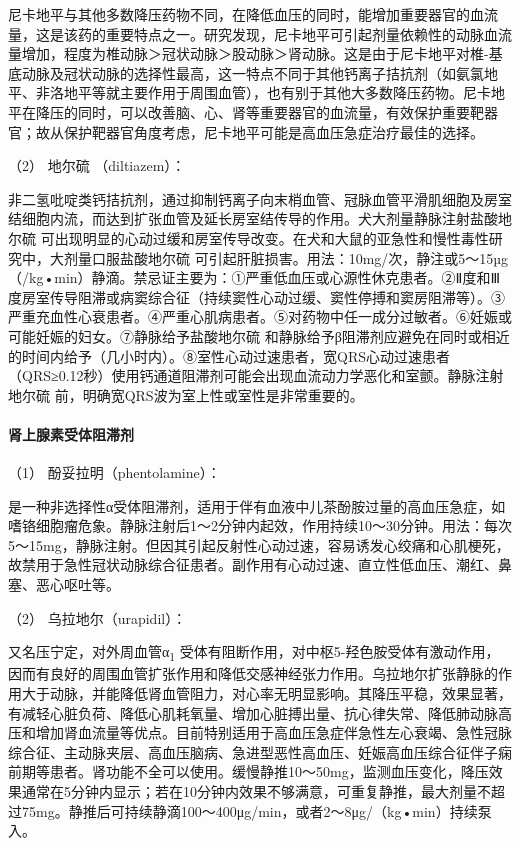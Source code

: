 尼卡地平与其他多数降压药物不同，在降低血压的同时，能增加重要器官的血流量，这是该药的重要特点之一。研究发现，尼卡地平可引起剂量依赖性的动脉血流量增加，程度为椎动脉＞冠状动脉＞股动脉＞肾动脉。这是由于尼卡地平对椎-基底动脉及冠状动脉的选择性最高，这一特点不同于其他钙离子拮抗剂（如氨氯地平、非洛地平等就主要作用于周围血管），也有别于其他大多数降压药物。尼卡地平在降压的同时，可以改善脑、心、肾等重要器官的血流量，有效保护重要靶器官；故从保护靶器官角度考虑，尼卡地平可能是高血压急症治疗最佳的选择。

\hypertarget{text00108.htmlux5cux23CHP4-7-3-2-2-2-2}{}
（2） 地尔硫{} （diltiazem）：

非二氢吡啶类钙拮抗剂，通过抑制钙离子向末梢血管、冠脉血管平滑肌细胞及房室结细胞内流，而达到扩张血管及延长房室结传导的作用。犬大剂量静脉注射盐酸地尔硫{}
可出现明显的心动过缓和房室传导改变。在犬和大鼠的亚急性和慢性毒性研究中，大剂量口服盐酸地尔硫{}
可引起肝脏损害。用法：10mg/次，静注或5～15µg（/kg•min）静滴。禁忌证主要为：①严重低血压或心源性休克患者。②Ⅱ度和Ⅲ度房室传导阻滞或病窦综合征（持续窦性心动过缓、窦性停搏和窦房阻滞等）。③严重充血性心衰患者。④严重心肌病患者。⑤对药物中任一成分过敏者。⑥妊娠或可能妊娠的妇女。⑦静脉给予盐酸地尔硫{}
和静脉给予β阻滞剂应避免在同时或相近的时间内给予（几小时内）。⑧室性心动过速患者，宽QRS心动过速患者（QRS≥0.12秒）使用钙通道阻滞剂可能会出现血流动力学恶化和室颤。静脉注射地尔硫{}
前，明确宽QRS波为室上性或室性是非常重要的。

\paragraph{肾上腺素受体阻滞剂}

\hypertarget{text00108.htmlux5cux23CHP4-7-3-2-2-3-1}{}
（1） 酚妥拉明（phentolamine）：

是一种非选择性α受体阻滞剂，适用于伴有血液中儿茶酚胺过量的高血压急症，如嗜铬细胞瘤危象。静脉注射后1～2分钟内起效，作用持续10～30分钟。用法：每次5～15mg，静脉注射。但因其引起反射性心动过速，容易诱发心绞痛和心肌梗死，故禁用于急性冠状动脉综合征患者。副作用有心动过速、直立性低血压、潮红、鼻塞、恶心呕吐等。

\hypertarget{text00108.htmlux5cux23CHP4-7-3-2-2-3-2}{}
（2） 乌拉地尔（urapidil）：

又名压宁定，对外周血管α\textsubscript{1}
受体有阻断作用，对中枢5-羟色胺受体有激动作用，因而有良好的周围血管扩张作用和降低交感神经张力作用。乌拉地尔扩张静脉的作用大于动脉，并能降低肾血管阻力，对心率无明显影响。其降压平稳，效果显著，有减轻心脏负荷、降低心肌耗氧量、增加心脏搏出量、抗心律失常、降低肺动脉高压和增加肾血流量等优点。目前特别适用于高血压急症伴急性左心衰竭、急性冠脉综合征、主动脉夹层、高血压脑病、急进型恶性高血压、妊娠高血压综合征伴子痫前期等患者。肾功能不全可以使用。缓慢静推10～50mg，监测血压变化，降压效果通常在5分钟内显示；若在10分钟内效果不够满意，可重复静推，最大剂量不超过75mg。静推后可持续静滴100～400μg/min，或者2～8μg/（kg•min）持续泵入。

